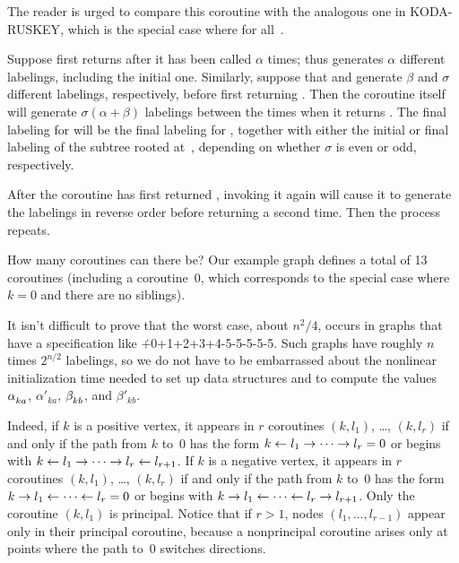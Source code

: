 The reader is urged to compare this coroutine with the analogous one
in {\mc KODA-RUSKEY}, which is the special case where 
for all~.

Suppose  first returns  after it has
been called
$\alpha$ times; thus  generates $\alpha$ different
labelings,
including the initial one. Similarly, suppose that 
and  generate $\beta$ and $\sigma$
different labelings, respectively, before first returning .
Then the coroutine 
itself will generate $\sigma(\alpha+\beta)$ labelings between the times
when it returns .
The final labeling for  will be the final labeling
for , together with either the initial or final labeling of
the subtree
rooted at~, depending on whether $\sigma$ is even or odd, respectively.

After the coroutine has first returned , invoking it again will
cause it to generate the labelings in reverse order before
returning  a second time. Then the process repeats.

\fi

How many coroutines can there be? Our example graph defines a total of
13 coroutines (including a coroutine~0, which corresponds to the special
case where $k=0$ and there are no siblings).

It isn't difficult to prove that the worst case, about $n^2\!/4$, occurs in
graphs that have a specification like \.{+0+1+2+3+4-5-5-5-5-5}.
Such graphs have roughly $n$ times $2^{n/2}$ labelings, so we do not have to be
embarrassed about the nonlinear initialization time needed to set up
data structures and to compute the values $\alpha\losub{ka}$, $\alpha'_{ka}$,
$\beta\losub{kb}$, and $\beta'_{kb}$.

Indeed, if $k$ is a positive vertex, it appears in $r$ coroutines
$(k,l_1)$, \dots, $(k,l_r)$ if and only if the path from $k$ to~0
has the form $k\gets l_1\to\cdots\to l_r=0$ or begins with
$k\gets l_1\to\cdots\to l_r\gets l_{r+1}$.
If $k$ is a negative vertex, it appears in $r$ coroutines
$(k,l_1)$, \dots, $(k,l_r)$ if and only if the path from $k$ to~0
has the form $k\to l_1\gets\cdots\gets l_r=0$ or begins with
$k\to l_1\gets\cdots\gets l_r\to l_{r+1}$.
Only the coroutine $(k,l_1)$ is principal. Notice that if $r>1$,
nodes $(l_1,\ldots,l_{r-1})$ appear only in their principal coroutine,
because a nonprincipal coroutine arises only at points where the path to~0
switches directions.

